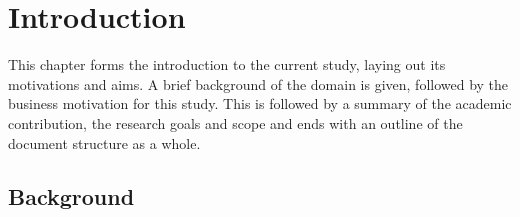 %
%
%
%
\chapter{Introduction}\label{C.intro}
{This chapter forms the introduction to the current study, laying out its motivations and aims. A brief background of the domain is given, followed by the business motivation for this study. This is followed by a summary of the academic contribution, the research goals and scope and ends with an outline of the document structure as a whole.  }
\section{Background}
